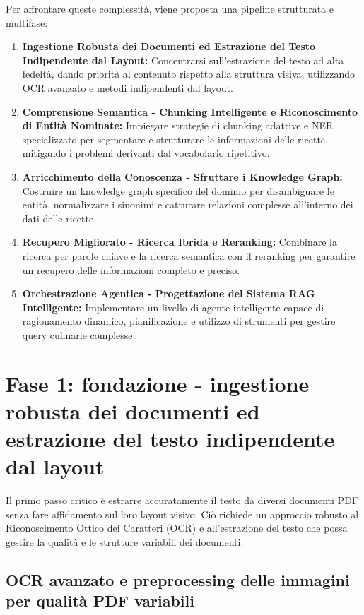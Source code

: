 \documentclass[a4paper, 11pt]{article}
\begin{document}
Per affrontare queste complessità, viene proposta una pipeline strutturata e multifase:
\begin{enumerate}
   \item \textbf{Ingestione Robusta dei Documenti ed Estrazione del Testo Indipendente dal Layout:} Concentrarsi sull'estrazione del testo ad alta fedeltà, dando priorità al contenuto rispetto alla struttura visiva, utilizzando OCR avanzato e metodi indipendenti dal layout.
   \item \textbf{Comprensione Semantica - Chunking Intelligente e Riconoscimento di Entità Nominate:} Impiegare strategie di chunking adattive e NER specializzato per segmentare e strutturare le informazioni delle ricette, mitigando i problemi derivanti dal vocabolario ripetitivo.
   \item \textbf{Arricchimento della Conoscenza - Sfruttare i Knowledge Graph:} Costruire un knowledge graph specifico del dominio per disambiguare le entità, normalizzare i sinonimi e catturare relazioni complesse all'interno dei dati delle ricette.
   \item \textbf{Recupero Migliorato - Ricerca Ibrida e Reranking:} Combinare la ricerca per parole chiave e la ricerca semantica con il reranking per garantire un recupero delle informazioni completo e preciso.
   \item \textbf{Orchestrazione Agentica - Progettazione del Sistema RAG Intelligente:} Implementare un livello di agente intelligente capace di ragionamento dinamico, pianificazione e utilizzo di strumenti per gestire query culinarie complesse.
\end{enumerate}

\section{Fase 1: fondazione - ingestione robusta dei documenti ed estrazione del testo indipendente dal layout}

Il primo passo critico è estrarre accuratamente il testo da diversi documenti PDF senza fare affidamento sul loro layout visivo. Ciò richiede un approccio robusto al Riconoscimento Ottico dei Caratteri (OCR) e all'estrazione del testo che possa gestire la qualità e le strutture variabili dei documenti.

\subsection{OCR avanzato e preprocessing delle immagini per qualità PDF variabili}
\end{document}
